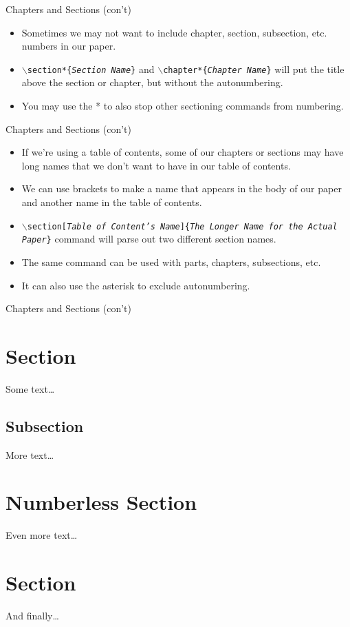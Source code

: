 \documentclass[pdf]{prosper}
\begin{document}
\begin{slide}{Chapters and Sections (con't)}
	\begin{itemize}
		\item Sometimes we may not want to include chapter, section, subsection, etc. numbers in our paper.
		\item \texttt{$\backslash$section*\{\textit{Section Name}\}} and \texttt{$\backslash$chapter*\{\textit{Chapter Name}\}} will put the title above the section or chapter, but without the autonumbering.
		\item You may use the * to also stop other sectioning commands from numbering.
	\end{itemize}
\end{slide}
\begin{slide}{Chapters and Sections (con't)}
	\begin{itemize}
		\item If we're using a table of contents, some of our chapters or sections may have long names that we don't want to have in our table of contents.
		\item We can use brackets to make a name that appears in the body of our paper and another name in the table of contents.
		\item \texttt{$\backslash$section[\textit{Table of Content's Name}]\{\textit{The Longer Name for the Actual Paper}\}} command will parse out two different section names.
		\item The same command can be used with parts, chapters, subsections, etc.
		\item It can also use the asterisk to exclude autonumbering.
	\end{itemize}
\end{slide}
\begin{slide}{Chapters and Sections (con't)}
	\section{Section}
	Some text\ldots
	\subsection{Subsection}
	More text\ldots
	\section*{Numberless Section}
	Even more text\ldots
	\section{Section}
	And finally\ldots
\end{slide}
\end{document}
